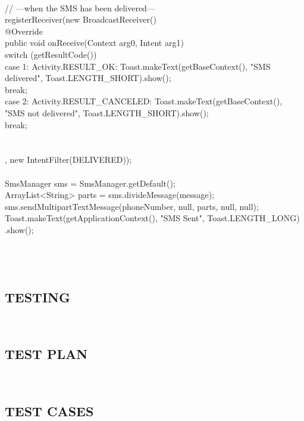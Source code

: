 \documentclass[12pt,a4paper]{article}
\begin{document}
{{{\\
		// ---when the SMS has been delivered---\\
		registerReceiver(new BroadcastReceiver() {\\
			@Override\\
			public void onReceive(Context arg0, Intent arg1) {\\
				switch (getResultCode()) {\\
				case 1: Activity.RESULT_OK:
					Toast.makeText(getBaseContext(), "SMS delivered",
							Toast.LENGTH_SHORT).show();\\
					break;\\
				case 2: Activity.RESULT_CANCELED:
					Toast.makeText(getBaseContext(), "SMS not delivered",
							Toast.LENGTH_SHORT).show();\\
					break;\\
				}\\
			}\\
		}, new IntentFilter(DELIVERED));\\
\\
		SmsManager sms = SmsManager.getDefault();\\
		ArrayList<String> parts = sms.divideMessage(message);\\
		sms.sendMultipartTextMessage(phoneNumber, null, parts, null, null);\\
		Toast.makeText(getApplicationContext(), "SMS Sent", Toast.LENGTH_LONG)
				.show();\\
	}\\
}\\
\\

\newpage
\pagestyle{plain}
\begin{center}
\section{TESTING}
\end{center} 
\hspace{0.7cm}\\
\subsection{TEST PLAN}
\\
\newpage
\subsection{TEST CASES}
\\
\newpage
}
\end{document}
